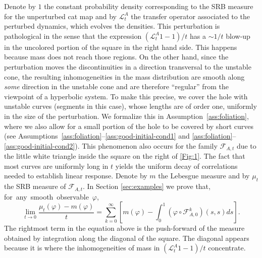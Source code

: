 \documentclass{amsart}
\numberwithin{equation}{section}
\newcommand\vf{\varphi}
\newcommand\cF{{\mathcal F}}
\newcommand\cL{{\mathcal L}}
\newcommand{\catt}{\cF_{A,t}}
\newcommand{\cato}{\cF_{A,0}}
\begin{document}

Denote by \(1\) the constant probability density corresponding to the SRB measure for the unperturbed cat map and by \(\cL_t^A\) the transfer operator associated to the perturbed dynamics, which evolves the densities. This perturbation is pathological in the sense that the expression \(( \cL^A_t 1 - 1)/t\) has a \(\sim 1/t\) blow-up in the uncolored portion of the square in the right hand side. This happens because mass does not reach those regions. On the other hand, since the perturbation moves the discontinuities in a direction transversal to the unstable cone, the resulting inhomogeneities in the mass distribution are smooth along \textit{some} direction in the unstable cone and are therefore “regular” from the viewpoint of a hyperbolic system. To make this precise, we cover the hole with unstable curves (segments in this case), whose lengths are of order one, uniformly in the size of the perturbation. We formalize this in Assumption~\ref{ass:foliation}, where we also allow for a small portion of the hole to be covered by short curves (see Assumptions~\ref{ass:foliation}–\ref{ass:good-initial-cond1} and \ref{ass:foliation}–\ref{ass:good-initial-cond2}). This phenomenon also occurs for the family \(\catt\) due to the little white triangle inside the square on the right of \ref{Fig:1}. The fact that most curves are uniformly long in $t$ yields the uniform decay of correlations needed to establish linear response. Denote by \(m\) the Lebesgue measure and by \(\mu_t\) the SRB measure of \(\catt\). In Section \ref{sec:examples} we prove that, \mbox{for any smooth observable \(\vf\),} 
 \[
    \lim_{t \to 0}\frac{\mu_{t}(\vf) - m(\vf)}{t} = \sum_{k =0}^{\infty}\left[m(\vf) - \int_0^1 (\vf \circ \cato^k)(s,s)ds \right].
 \]
The rightmost term in the equation above is the push-forward of the measure obtained by integration along the diagonal of the square. The diagonal appears because it is where the inhomogeneities of mass in \(( \cL^A_t 1 - 1)/t\) concentrate.
\end{document}
